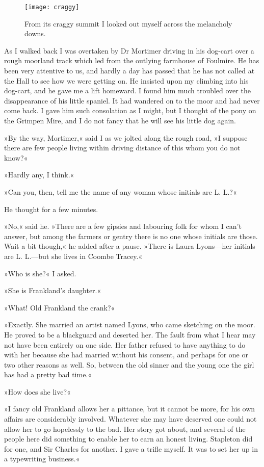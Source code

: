\begin{figure}[p]
\centering
\texttt{[image: craggy]}
\caption{From its craggy summit I looked out myself across the melancholy downs.}
\end{figure}

As I walked back I was overtaken by Dr Mortimer driving in his dog-cart over a rough moorland track which led from the outlying farmhouse of Foulmire. He has been very attentive to us, and hardly a day has passed that he has not called at the Hall to see how we were getting on. He insisted upon my climbing into his dog-cart, and he gave me a lift homeward. I found him much troubled over the disappearance of his little spaniel. It had wandered on to the moor and had never come back. I gave him such consolation as I might, but I thought of the pony on the Grimpen Mire, and I do not fancy that he will see his little dog again.

»By the way, Mortimer,« said I as we jolted along the rough road, »I suppose there are few people living within driving distance of this whom you do not know?«

»Hardly any, I think.«

»Can you, then, tell me the name of any woman whose initials are L. L.?«

He thought for a few minutes.

»No,« said he. »There are a few gipsies and labouring folk for whom I can't answer, but among the farmers or gentry there is no one whose initials are those. Wait a bit though,« he added after a pause. »There is Laura Lyons—her initials are L. L.—but she lives in Coombe Tracey.«

»Who is she?« I asked.

»She is Frankland's daughter.«

»What! Old Frankland the crank?«

»Exactly. She married an artist named Lyons, who came sketching on the moor. He proved to be a blackguard and deserted her. The fault from what I hear may not have been entirely on one side. Her father refused to have anything to do with her because she had married without his consent, and perhaps for one or two other reasons as well. So, between the old sinner and the young one the girl has had a pretty bad time.«

»How does she live?«

»I fancy old Frankland allows her a pittance, but it cannot be more, for his own affairs are considerably involved. Whatever she may have deserved one could not allow her to go hopelessly to the bad. Her story got about, and several of the people here did something to enable her to earn an honest living. Stapleton did for one, and Sir Charles for another. I gave a trifle myself. It was to set her up in a typewriting business.«

